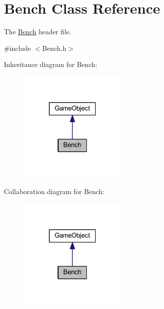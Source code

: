 \hypertarget{class_bench}{\section{Bench Class Reference}
\label{class_bench}
}


The \hyperlink{class_bench}{Bench} header file.  




{\ttfamily \#include $<$Bench.\+h$>$}



Inheritance diagram for Bench\+:\nopagebreak
\begin{figure}[H]
\begin{center}
\leavevmode
\includegraphics[width=151pt]{class_bench__inherit__graph}
\end{center}
\end{figure}


Collaboration diagram for Bench\+:\nopagebreak
\begin{figure}[H]
\begin{center}
\leavevmode
\includegraphics[width=151pt]{class_bench__coll__graph}
\end{center}
\end{figure}
